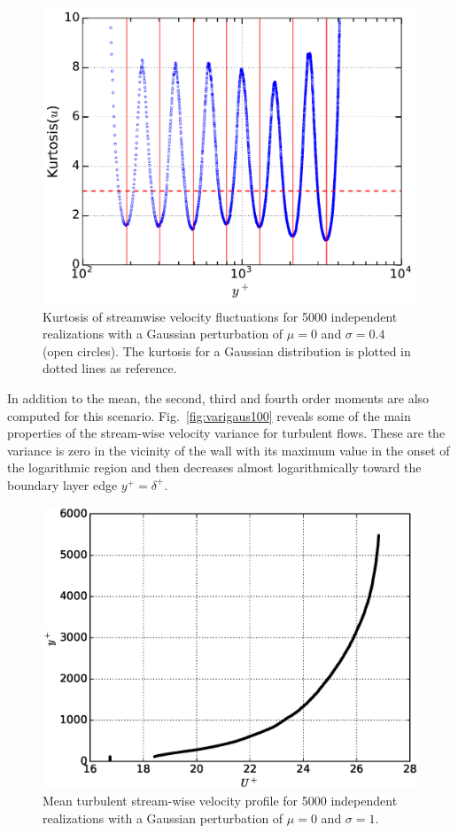 \documentclass[aps,reprint,amsmath,amssymb,pra,floatfix]{revtex4-1}%
\begin{document}
\begin{figure}[tb]
\includegraphics[scale=0.46]{figures/kurtosis_5000_assembles}
\caption{\label{fig:kurt} Kurtosis of streamwise velocity fluctuations for 5000 independent realizations with a Gaussian perturbation of $\mu=0$ and $\sigma=0.4$ (open circles). The kurtosis for a Gaussian distribution is plotted in dotted lines as reference.}
\end{figure}
In addition to the mean, the second, third and fourth order moments are also computed for this scenario. Fig.~\ref{fig:varigaus100} reveals some of the main properties of the stream-wise velocity variance for turbulent flows.  These are the variance is zero in the vicinity of the wall with its maximum value in the onset of the logarithmic region and then decreases almost logarithmically toward the boundary layer edge $y^+=\delta^+$. 
\begin{figure}[tb]
\includegraphics[scale=0.46]{figures/Master_averaged_step_profile_5000_assembles_gaus100}
\caption{\label{fig:mp_gau100} Mean turbulent stream-wise velocity profile for 5000 independent realizations with a Gaussian perturbation of $\mu=0$ and $\sigma=1$.}
\end{figure}
\end{document}
